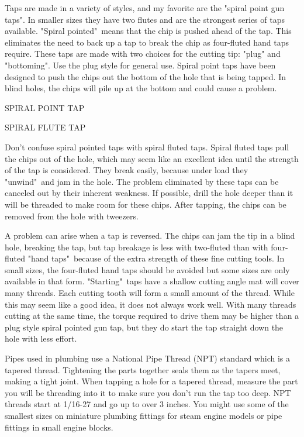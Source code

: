 Taps are made in a variety of styles, and my favorite are the "spiral point gun
taps". In smaller sizes they have two flutes and are the strongest series of
taps available. "Spiral pointed"\ means that the chip is pushed ahead of the tap.
This eliminates the need to back up a tap to break the chip as four-fluted hand
taps require. These taps are made with two choices for the cutting tip: "plug"
and "bottoming". Use the plug style for general use. Spiral point taps have been
designed to push the chips out the bottom of the hole that is being tapped. In
blind holes, the chips will pile up at the bottom and could cause a problem.

\bigskip
\textsc{SPIRAL POINT TAP}

\textsc{SPIRAL FLUTE TAP}
\bigskip


Don't confuse spiral pointed taps with spiral fluted taps. Spiral fluted taps
pull the chips out of the hole, which may seem like an excellent idea until the
strength of the tap is considered. They break easily, because under load they
"unwind"\ and jam in the hole. The problem eliminated by these taps can be
canceled out by their inherent weakness. If possible, drill the hole deeper than
it will be threaded to make room for these chips. After tapping, the chips can
be removed from the hole with tweezers.

A problem can arise when a tap is reversed. The chips can jam the tip in a blind
hole, breaking the tap, but tap breakage is less with two-fluted than with
four-fluted "hand taps"\ because of the extra strength of these fine cutting
tools. In small sizes, the four-fluted hand taps should be avoided but some
sizes are only available in that form. "Starting"\ taps have a shallow cutting
angle mat will cover many threads. Each cutting tooth will form a small amount
of the thread. While this may seem like a good idea, it does not always work
well. With many threads cutting at the same time, the torque required to drive
them may be higher than a plug style spiral pointed gun tap, but they do start
the tap straight down the hole with less effort.


Pipes used in plumbing use a National Pipe Thread (NPT) standard which is a
tapered thread. Tightening the parts together seals them as the tapers meet,
making a tight joint. When tapping a hole for a tapered thread, measure the part
you will be threading into it to make sure you don't run the tap too deep. NPT
threads start at 1/16-27 and go up to over 3 inches. You might use some of the
smallest sizes on miniature plumbing fittings for steam engine models or pipe
fittings in small engine blocks.

